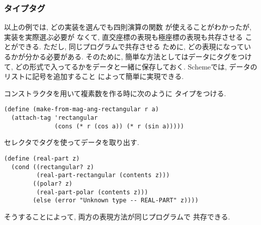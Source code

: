 \subsubsection{タイプタグ}
以上の例では, どの実装を選んでも四則演算の関数
が使えることがわかったが, 実装を実際選ぶ必要が
なくて, 直交座標の表現も極座標の表現も共存させる
ことができる. ただし, 同じプログラムで共存させる
ために, どの表現になっているかが分かる必要がある.
そのために, 簡単な方法としてはデータにタグをつけて,
どの形式で入ってるかをデータと一緒に保存しておく.
Schemeでは, データのリストに記号を追加すること
によって簡単に実現できる.

コンストラクタを用いて複素数を作る時に次のように
タイプをつける.

\begin{lstlisting}[basicstyle=\scriptsize]
(define (make-from-mag-ang-rectangular r a)
  (attach-tag 'rectangular
              (cons (* r (cos a)) (* r (sin a)))))
\end{lstlisting}

セレクタでタグを使ってデータを取り出す.

\begin{lstlisting}[basicstyle=\scriptsize]
(define (real-part z)
  (cond ((rectangular? z)
         (real-part-rectangular (contents z)))
        ((polar? z)
         (real-part-polar (contents z)))
        (else (error "Unknown type -- REAL-PART" z))))
\end{lstlisting}

そうすることによって, 両方の表現方法が同じプログラムで
共存できる.
